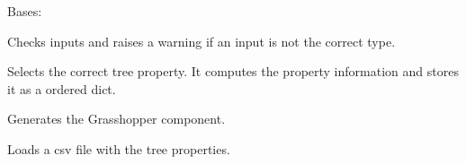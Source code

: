 \documentclass[letterpaper,10pt,english]{sphinxmanual}
\begin{document}

\begin{fulllineitems}
\label{\detokenize{cmf:livestock.components.comp_cmf.CMFSyntheticTree}}
Bases: {\hyperref[\detokenize{superclass:livestock.components.component.GHComponent}]{}}

\begin{fulllineitems}
\label{\detokenize{cmf:livestock.components.comp_cmf.CMFSyntheticTree.check_inputs}}
Checks inputs and raises a warning if an input is not the correct type.

\end{fulllineitems}


\begin{fulllineitems}
\label{\detokenize{cmf:livestock.components.comp_cmf.CMFSyntheticTree.compute_tree}}
Selects the correct tree property. It computes the property information and stores it as a ordered dict.

\end{fulllineitems}


\begin{fulllineitems}
\label{\detokenize{cmf:livestock.components.comp_cmf.CMFSyntheticTree.config}}
Generates the Grasshopper component.

\end{fulllineitems}


\begin{fulllineitems}
\label{\detokenize{cmf:livestock.components.comp_cmf.CMFSyntheticTree.load_csv}}
Loads a csv file with the tree properties.


\end{fulllineitems}
\end{fulllineitems}
\end{document}
